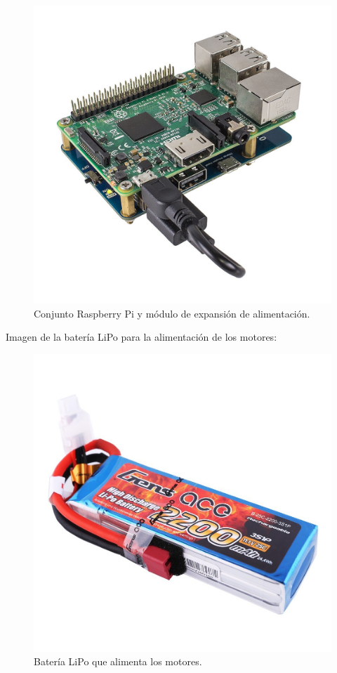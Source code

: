 \begin{figure}[H]
  \begin{center}
    \includegraphics[scale=0.15]{imagenes/modulo-expansion-rpi.jpg}
  \end{center}
  \caption{Conjunto Raspberry Pi y módulo de expansión de alimentación.}
  \label{figura:rpi-modulo-bateria}
\end{figure}

Imagen de la batería LiPo para la alimentación de los motores:

\begin{figure}[H]
  \begin{center}
    \includegraphics[scale=0.1]{imagenes/robot/bateria.jpg}
  \end{center}
  \caption{Batería LiPo que alimenta los motores.}
  \label{figura:rpi-modulo-bateria}
\end{figure}


